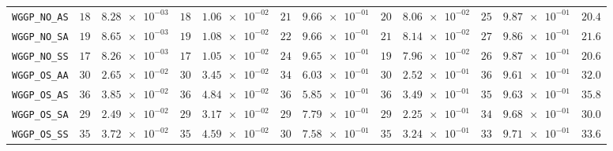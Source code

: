 \begin{xltabular}{\textwidth}{l||cC|cC|cC|cC|cC||c}
	\texttt{WGGP\_NO\_AS} & $ 18$ & $ \num{8.28e-03}$ & $ 18$ & $ \num{1.06e-02}$ & $ 21$ & $ \num{9.66e-01}$ & $ 20$ & $ \num{8.06e-02}$ & $ 25$ & $ \num{9.87e-01}$ & $ 20.4$  \\
	\texttt{WGGP\_NO\_SA} & $ 19$ & $ \num{8.65e-03}$ & $ 19$ & $ \num{1.08e-02}$ & $ 22$ & $ \num{9.66e-01}$ & $ 21$ & $ \num{8.14e-02}$ & $ 27$ & $ \num{9.86e-01}$ & $ 21.6$  \\
	\texttt{WGGP\_NO\_SS} & $ 17$ & $ \num{8.26e-03}$ & $ 17$ & $ \num{1.05e-02}$ & $ 24$ & $ \num{9.65e-01}$ & $ 19$ & $ \num{7.96e-02}$ & $ 26$ & $ \num{9.87e-01}$ & $ 20.6$  \\
	\texttt{WGGP\_OS\_AA} & $ 30$ & $ \num{2.65e-02}$ & $ 30$ & $ \num{3.45e-02}$ & $ 34$ & $ \num{6.03e-01}$ & $ 30$ & $ \num{2.52e-01}$ & $ 36$ & $ \num{9.61e-01}$ & $ 32.0$  \\
	\texttt{WGGP\_OS\_AS} & $ 36$ & $ \num{3.85e-02}$ & $ 36$ & $ \num{4.84e-02}$ & $ 36$ & $ \num{5.85e-01}$ & $ 36$ & $ \num{3.49e-01}$ & $ 35$ & $ \num{9.63e-01}$ & $ 35.8$  \\
	\texttt{WGGP\_OS\_SA} & $ 29$ & $ \num{2.49e-02}$ & $ 29$ & $ \num{3.17e-02}$ & $ 29$ & $ \num{7.79e-01}$ & $ 29$ & $ \num{2.25e-01}$ & $ 34$ & $ \num{9.68e-01}$ & $ 30.0$  \\
	\texttt{WGGP\_OS\_SS} & $ 35$ & $ \num{3.72e-02}$ & $ 35$ & $ \num{4.59e-02}$ & $ 30$ & $ \num{7.58e-01}$ & $ 35$ & $ \num{3.24e-01}$ & $ 33$ & $ \num{9.71e-01}$ & $ 33.6$  \\

\end{xltabular}
